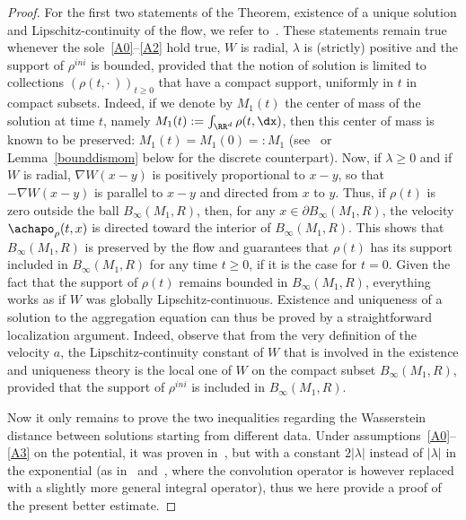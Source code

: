 \begin{proof}
For the first two statements of the Theorem, existence of a unique solution and Lipschitz-continuity of the flow, we refer to~\cite{CJLV}. These statements remain true whenever the sole~\eqref{A0}--\eqref{A2} hold true, $W$ is radial, $\lambda$ is (strictly) positive and the support of $\rho^{ini}$ is bounded, provided that the notion of solution is limited to collections $(\rho(t,{\cdot\,}))_{t \geq 0}$ that have a compact support, uniformly in $t$ in compact subsets. Indeed, if we denote by $M_1(t)$ the center of mass of the solution at time $t$, namely $M_1(t) := \int_{\RR^d} \rho(t,\dx)$, then this center of mass is known to be preserved: $M_1(t) = M_1(0) =: M_1$ (see~\cite{CJLV} or Lemma~\ref{bounddismom} below for the discrete counterpart). Now, if $\lambda \geq 0$ and if $W$ is radial, $\nabla W(x - y)$ is positively proportional to $x-y$, so that $-\nabla W(x - y)$ is parallel to $x - y$ and directed from $x$ to $y$. Thus, if $\rho(t)$ is zero outside the ball $B_\infty(M_1,R)$, then, for any $x \in \partial B_\infty(M_1,R)$, the velocity $\achapo_\rho(t,x)$ is directed toward the interior of $B_\infty(M_1,R)$. This shows that $B_\infty(M_1,R)$ is preserved by the flow and guarantees that $\rho(t)$ has its support included in $B_\infty(M_1,R)$ for any time $t \geq 0$, if it is the case for $t = 0$. Given the fact that the support of $\rho(t)$ remains bounded in $B_\infty(M_1,R)$, everything works as if $W$ was globally Lipschitz-continuous. Existence and uniqueness of a solution to the aggregation equation can thus be proved by a straightforward localization argument. Indeed, observe that from the very definition of the velocity $a$, the Lipschitz-continuity constant of $W$ that is involved in the existence and uniqueness theory is the local one of $W$ on the compact subset $B_{\infty}(M_{1},R)$, provided that the support of $\rho^{ini}$ is included in $B_{\infty}(M_{1},R)$.

Now it only remains to prove the two inequalities regarding the Wasserstein distance between solutions starting from different data. Under assumptions~\eqref{A0}--\eqref{A3} on the potential, it was proven in~\cite{CJLV}, but with a constant $2|\lambda|$ instead of $|\lambda|$ in the exponential (as in~\cite{dob} and~\cite {Golse}, where the convolution operator is however replaced with a slightly more general integral operator), thus we here provide a proof of the present better estimate.


\end{proof}
